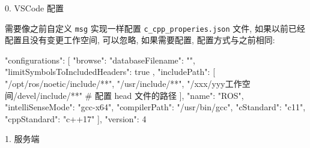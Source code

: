 \documentclass[openany, fontset=windowsold]{ctexbook}
\theoremstyle{kaiti}
\theoremstyle{normal}
\begin{document}
0. VSCode 配置

需要像之前自定义 \verb|msg| 实现一样配置 \verb|c_cpp_properies.json| 文件, 如果以前已经配置且没有变更工作空间, 可以忽略, 如果需要配置, 配置方式与之前相同:

\begin{bash}
  {
      "configurations": [
          {
              "browse": {
                  "databaseFilename": "",
                  "limitSymbolsToIncludedHeaders": true
              },
              "includePath": [
                  "/opt/ros/noetic/include/**",
                  "/usr/include/**",
                  "/xxx/yyy工作空间/devel/include/**" # 配置 head 文件的路径 
              ],
              "name": "ROS",
              "intelliSenseMode": "gcc-x64",
              "compilerPath": "/usr/bin/gcc",
              "cStandard": "c11",
              "cppStandard": "c++17"
          }
      ],
      "version": 4
  }
\end{bash}

1. 服务端
\end{document}
